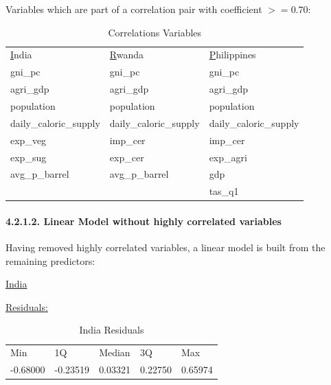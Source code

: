 \documentclass[11pt]{article}
\begin{document}
\newpage
Variables which are part of a correlation pair with coefficient $>= 0.70$:

\FloatBarrier
\begin{table}[!htbp]
\centering
\begin{tabular}{lll}
{\ul India}            & {\ul Rwanda}           & {\ul Philippines}      \\
gni\_pc                & gni\_pc                & gni\_pc                \\
agri\_gdp              & agri\_gdp              & agri\_gdp              \\
population             & population             & population             \\
daily\_caloric\_supply & daily\_caloric\_supply & daily\_caloric\_supply \\
exp\_veg               & imp\_cer               & imp\_cer               \\
exp\_sug               & exp\_cer               & exp\_agri              \\
avg\_p\_barrel         & avg\_p\_barrel         & gdp                    \\
                       &                        & tas\_q1               
\end{tabular}
\caption{Correlations Variables}
\label{table6}
\end{table}
\FloatBarrier

\paragraph{4.2.1.2. Linear Model without highly correlated variables}

Having removed highly correlated variables, a linear model is built from the remaining predictors:
\begin{center}\underline{India}\\ \end{center}
\underline{Residuals:}
\begin{table}[!htbp]
\centering

\begin{tabular}{lllll}
Min      & 1Q       & Median  & 3Q      & Max     \\
-0.68000 & -0.23519 & 0.03321 & 0.22750 & 0.65974
\end{tabular}
\caption{India Residuals}
\label{table7}
\end{table}
\end{document}
